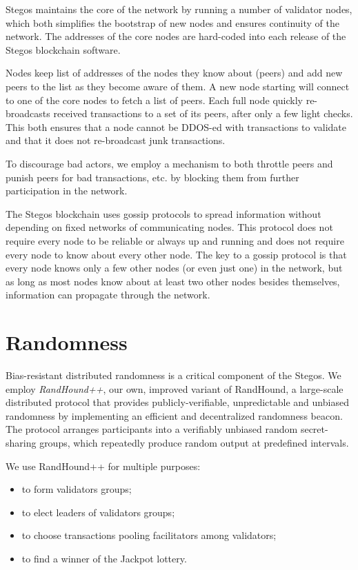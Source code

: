\documentclass[a4paper, 10pt, conference]{ieeeconf}
\begin{document}
Stegos maintains the core of the network by running a number of validator nodes, which both simplifies the bootstrap of new nodes and ensures continuity of the network. The addresses of the core nodes are hard-coded into each release of the Stegos blockchain software.

Nodes keep list of addresses of the nodes they know about (peers) and add new peers to the list as they become aware of them. A new node starting will connect to one of the core nodes to fetch a list of peers. Each full node quickly re-broadcasts received transactions to a set of its peers, after only a few light checks. This both ensures that a node cannot be DDOS-ed with transactions to validate and that it does not re-broadcast junk transactions.

To discourage bad actors, we employ a mechanism to both throttle peers and punish peers for bad transactions, etc. by blocking them from further participation in the network.

The Stegos blockchain uses gossip protocols to spread information without depending on fixed networks of communicating nodes. This protocol does not require every node to be reliable or always up and running and does not require every node to know about every other node. The key to a gossip protocol is that every node knows only a few other nodes (or even just one) in the network, but as long as most nodes know about at least two other nodes besides themselves, information can propagate through the network.

\section{Randomness}\label{randomness}

Bias-resistant distributed randomness is a critical component of the Stegos. We employ \textit{RandHound++}, our own, improved variant of RandHound\cite{c12}, a large-scale distributed protocol that provides publicly-verifiable, unpredictable and unbiased randomness by implementing an efficient and decentralized randomness beacon. The protocol arranges participants into a verifiably unbiased random secret-sharing groups, which repeatedly produce random output at predefined intervals. 

We use RandHound++ for multiple purposes:

\begin{itemize}
	\item {to form validators groups;}
	\item {to elect leaders of validators groups;} 
	\item {to choose transactions pooling facilitators among validators;}
	\item {to find a winner of the Jackpot lottery.}
\end{itemize}
\end{document}
